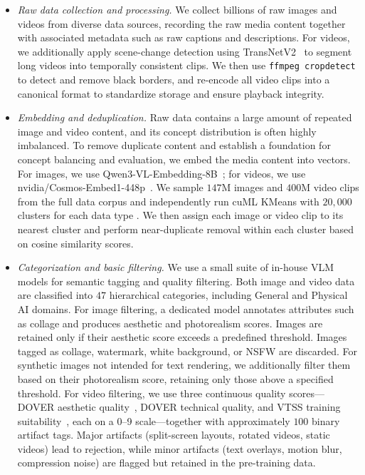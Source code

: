\begin{itemize}

\item \textit{Raw data collection and processing.} We collect billions of raw images and videos from diverse data sources, recording the raw media content together with associated metadata such as raw captions and descriptions. For videos, we additionally apply scene-change detection using TransNetV2~\citep{soucek2020transnetv2} to segment long videos into temporally consistent clips. We then use \texttt{ffmpeg cropdetect} to detect and remove black borders, and re-encode all video clips into a canonical format to standardize storage and ensure playback integrity.

\item \textit{Embedding and deduplication.} Raw data contains a large amount of repeated image and video content, and its concept distribution is often highly imbalanced. To remove duplicate content and establish a foundation for concept balancing and evaluation, we embed the media content into vectors. For images, we use Qwen3-VL-Embedding-8B~\citep{qwen3vlembedding}; for videos, we use nvidia/Cosmos-Embed1-448p~\citep{nvidia2025cosmosembed1}. We sample $147$M images and $400$M video clips from the full data corpus and independently run cuML KMeans with $20,000$ clusters for each data type \citep{cuml, kmeans}. We then assign each image or video clip to its nearest cluster and perform near-duplicate removal within each cluster based on cosine similarity scores.

\item \textit{Categorization and basic filtering.} We use a small suite of in-house VLM models for semantic tagging and quality filtering. Both image and video data are classified into $47$ hierarchical categories, including General and Physical AI domains. For image filtering, a dedicated model annotates attributes such as collage and produces aesthetic and photorealism scores. Images are retained only if their aesthetic score exceeds a predefined threshold. Images tagged as collage, watermark, white background, or NSFW are discarded. For synthetic images not intended for text rendering, we additionally filter them based on their photorealism score, retaining only those above a specified threshold. For video filtering, we use three continuous quality scores---DOVER aesthetic quality~\citep{dover}, DOVER technical quality, and VTSS training suitability~\citep{koala}, each on a 0--9 scale---together with approximately $100$ binary artifact tags. Major artifacts (split-screen layouts, rotated videos, static videos) lead to rejection, while minor artifacts (text overlays, motion blur, compression noise) are flagged but retained in the pre-training data.

\end{itemize}

